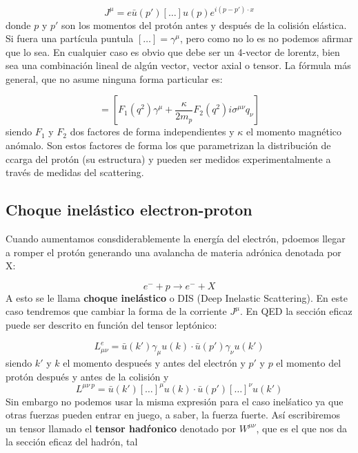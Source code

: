 \begin{equation}
	J^\mu = e \bar{u} (p') [ \ldots ] u(p) e^{i (p-p') \cdot x}
\end{equation}
donde $p$ y $p'$ son los momentos del protón antes y después de la colisión elástica. Si fuera una partícula puntula $[\ldots]=\gamma^\mu$, pero como no lo es no podemos afirmar que lo sea. En cualquier caso es obvio que debe ser un 4-vector de lorentz, bien sea una combinación lineal de algún vector, vector axial o tensor. La fórmula más general, que no asume ninguna forma particular es:

\begin{equation}
	[ \ldots ] = \left[ {F_1(q^2) \gamma^\mu + \frac{\kappa}{2 m_p} F_2(q^2) i \sigma^{\mu\nu} q_\nu} \right]
\end{equation}
siendo $F_1$ y $F_2$ dos factores de forma independientes y $\kappa$ el momento magnético anómalo. Son estos factores de forma los que parametrizan la distribución de ccarga del protón (su estructura) y pueden ser medidos experimentalmente a través de medidas del scattering.


\subsection{Choque inelástico electron-proton}

Cuando aumentamos consdiderablemente la energía del electrón, pdoemos llegar a romper el protón generando una avalancha de materia adrónica denotada por X:

\begin{equation}
	e^- + p \to e^- + X
\end{equation}
A esto se le llama \textbf{choque inelástico} o DIS (Deep Inelastic Scattering). En este caso tendremos que cambiar la forma de la corriente $J^\mu$. En QED la sección eficaz puede ser descrito en función del tensor leptónico:

\begin{equation}
	L_{\mu \nu}^e = \bar{u}(k') \gamma_\mu u(k) \cdot \bar{u}(p') \gamma_\nu u(k')
\end{equation}
siendo $k'$ y $k$ el momento despueés y antes del electrón y $p'$ y $p$ el momento del protón después y antes de la colisión y
\begin{equation}
	L^{\mu \nu \ p} = \bar{u}(k') [\ldots]^\mu u(k) \cdot \bar{u}(p') [\ldots]^{\nu} u(k')
\end{equation}
Sin embargo no podemos usar la misma expresión para el caso inelśatico ya que otras fuerzas pueden entrar en juego, a saber, la fuerza fuerte. Así escribiremos un tensor llamado el \textbf{tensor hadŕonico} denotado por $W^{\mu \nu}$, que es el que nos da la sección eficaz del hadrón, tal


